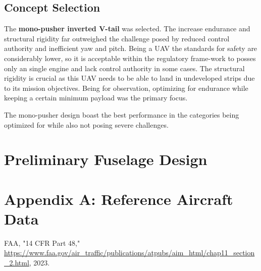 \documentclass[12pt]{article}
\begin{document}
	\subsection{Concept Selection}
	The \textbf{mono-pusher inverted V-tail} was selected. The increase endurance and structural rigidity far outweighed the challenge posed by reduced control authority and inefficient yaw and pitch. Being a UAV the standards for safety are considerably lower, so it is acceptable within the regulatory frame-work to posses only an single engine and lack control authority in some cases. The structural rigidity is crucial as this UAV needs to be able to land in undeveloped strips due to its mission objectives. Being for observation, optimizing for endurance while keeping a certain minimum payload was the primary focus. 
	
	The mono-pusher design boast the best performance in the categories being optimized for while also not posing severe challenges.
	
	\section{Preliminary Fuselage Design}
	
	\newpage
	
	\appendix
	\section{Appendix A: Reference Aircraft Data}
	
	
	\newpage
	
	\begin{thebibliography}{9}
		FAA, "14 CFR Part 48," \url{https://www.faa.gov/air_traffic/publications/atpubs/aim_html/chap11_section_2.html}, 2023.
	\end{thebibliography}
	
\end{document}
